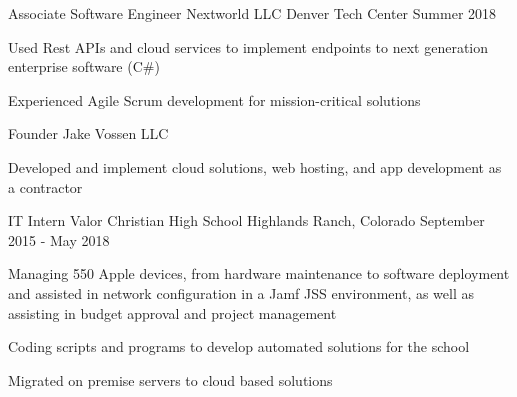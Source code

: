 

\begin{cventries}

  \cventry
    {Associate Software Engineer} %
    {Nextworld LLC} %
    {Denver Tech Center} %
    {Summer 2018} %
    {
      \begin{cvitems} %
        \item {Used Rest APIs and cloud services to implement
            endpoints to next generation enterprise software (C\#)}
        \item {Experienced Agile Scrum development for mission-critical solutions}
      \end{cvitems}
    }

  \cventry
    {Founder}
    {Jake Vossen LLC} %
    {} %
    { }
    {
      \begin{cvitems} %
        \item {Developed and implement cloud solutions, web hosting,
            and app development as a contractor}
      \end{cvitems}
    }

  \cventry
    {IT Intern}
    {Valor Christian High School }
    {Highlands Ranch, Colorado} %
    {September 2015 - May 2018} %
    {
      \begin{cvitems} %
        \item {Managing 550 Apple devices, from hardware maintenance
            to software deployment and assisted in network
            configuration in a Jamf JSS environment, as well as
            assisting in budget approval and project management}
        \item {Coding scripts and programs to develop automated
            solutions for the school}
        \item {Migrated on premise servers to cloud based solutions}
      \end{cvitems}
    }
\end{cventries}

